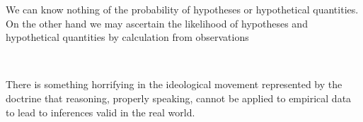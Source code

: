 
\begin{singlespacing}
\begin{displayquote}
We can know nothing of the probability of hypotheses or hypothetical
quantities.
On the other hand we may ascertain the likelihood of hypotheses
and hypothetical quantities by calculation from observations
\end{displayquote}
\end{singlespacing}
~\cite{fisher1921probable}

\begin{singlespacing}
\begin{displayquote}
There is something horrifying in the ideological movement represented by the
doctrine that reasoning, properly speaking, cannot be applied to empirical data
to lead to inferences valid in the real world.
\end{displayquote}
\end{singlespacing}
~\cite{fisher1956statistical}

